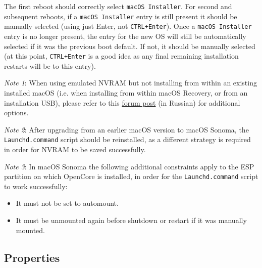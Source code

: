 \documentclass[]{article}
\providecommand{\tightlist}{%
  \setlength{\itemsep}{0pt}\setlength{\parskip}{0pt}}
\begin{document}
The first reboot should correctly select \texttt{macOS Installer}. For second and subsequent reboots, if a \texttt{macOS Installer}
entry is still present it should be manually selected (using just Enter, not \texttt{CTRL+Enter}). Once a \texttt{macOS Installer}
entry is no longer present, the entry for the new OS will still be automatically selected if it was the previous boot default.
If not, it should be manually selected (at this point, \texttt{CTRL+Enter} is a good idea as any final remaining installation restarts
will be to this entry).

\emph{Note 1}: When using emulated NVRAM but not installing from within an existing installed macOS (i.e. when installing from
within macOS Recovery, or from an installation USB), please refer to this
\href{https://applelife.ru/posts/916248}{forum post} (in Russian)
for additional options.

\emph{Note 2}: After upgrading from an earlier macOS version to macOS Sonoma, the \texttt{Launchd.command} script should be
reinstalled, as a different strategy is required in order for NVRAM to be saved successfully.

\emph{Note 3}: In macOS Sonoma the following additional constraints apply to the ESP partition on which
OpenCore is installed, in order for the \texttt{Launchd.command} script to work successfully:

\begin{itemize}
\tightlist
 \item It must not be set to automount.
 \item It must be unmounted again before shutdown or restart if it was manually mounted.
\end{itemize}

\subsection{Properties}\label{uefiprops}
\end{document}
